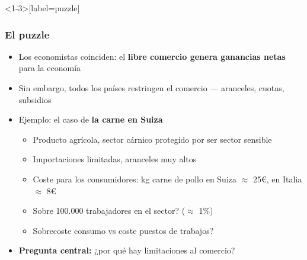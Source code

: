 \begin{frame}<1-3>[label=puzzle]
\frametitle{El puzzle}
\centering

\begin{itemize}
  \item Los economistas coinciden: el \textbf{libre comercio genera ganancias netas} para la economía
  \item<2-> Sin embargo, \alert{todos los países restringen el comercio} --- aranceles, cuotas, subsidios
  \item<3-> Ejemplo: el caso de \textbf{la carne en Suiza}
  \begin{itemize}
    \item<4-> Producto agrícola, sector cárnico protegido por ser sector sensible
    \item<4-> Importaciones limitadas, aranceles muy altos
    \item<4-> Coste para los consumidores: kg carne de pollo en Suiza $\approx$ 25€, en Italia $\approx$ 8€
    \item<5-> Sobre 100.000 trabajadores en el sector? ($\approx$ 1\%)
    \item<5-> Sobrecoste consumo vs coste puestos de trabajos?
  \end{itemize}
  \item<6-> \textbf{Pregunta central:} ¿por qué hay limitaciones al comercio?
\end{itemize}

\end{frame}

\note{}

\note{}

